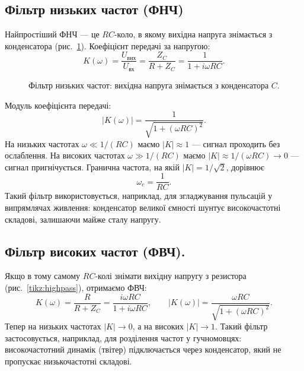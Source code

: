 \subsection*{Фільтр низьких частот (ФНЧ)}

Найпростіший ФНЧ --- це $RC$-коло, в якому вихідна напруга знімається з конденсатора (рис.~\ref{tikz:lowpass}). Коефіцієнт передачі за напругою:
\begin{equation}\label{eq:lowpass_transfer}
	K(\omega) = \frac{U_{\text{вих}}}{U_{\text{вх}}}
	          = \frac{Z_C}{R + Z_C}
	          = \frac{1}{1 + i\omega RC}.
\end{equation}

\begin{figure}
	\centering
	\caption{Фільтр низьких частот: вихідна напруга знімається з конденсатора $C$.}
	\label{tikz:lowpass}
\end{figure}

Модуль коефіцієнта передачі:
\begin{equation}\label{eq:lowpass_magnitude}
	|K(\omega)| = \frac{1}{\sqrt{1 + (\omega RC)^2}}.
\end{equation}
На низьких частотах $\omega \ll 1/(RC)$ маємо $|K| \approx 1$ --- сигнал проходить без ослаблення. На високих частотах $\omega \gg 1/(RC)$ маємо $|K| \approx 1/(\omega RC) \to 0$ --- сигнал пригнічується. Гранична частота, на якій $|K| = 1/\sqrt{2}$, дорівнює
\begin{equation}\label{eq:lowpass_cutoff}
	\omega_c = \frac{1}{RC}.
\end{equation}
Такий фільтр використовується, наприклад, для згладжування пульсацій у випрямлячах живлення: конденсатор великої ємності шунтує високочастотні складові, залишаючи майже сталу напругу.

\subsection*{Фільтр високих частот (ФВЧ).}

Якщо в тому самому $RC$-колі знімати вихідну напругу з резистора (рис.~\ref{tikz:highpass}), отримаємо ФВЧ:
\begin{equation}\label{eq:highpass_transfer}
	K(\omega) = \frac{R}{R + Z_C} = \frac{i\omega RC}{1 + i\omega RC},
	\qquad
	|K(\omega)| = \frac{\omega RC}{\sqrt{1 + (\omega RC)^2}}.
\end{equation}
Тепер на низьких частотах $|K| \to 0$, а на високих $|K| \to 1$. Такий фільтр застосовується, наприклад, для розділення частот у гучномовцях: високочастотний динамік (твітер) підключається через конденсатор, який не пропускає низькочастотні складові.

